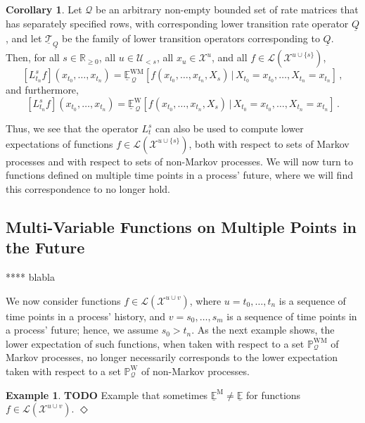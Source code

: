 \documentclass[10pt]{paper}
\theoremstyle{definition}
\newtheorem{exmp}{Example}%
\newtheorem{corollary}[theorem]{Corollary}
\newcommand{\reals}{\mathbb{R}}
\newcommand{\realsnonneg}{\reals_{\geq 0}}
\newcommand{\states}{\mathcal{X}}
\newcommand{\processes}{\mathbb{P}}
\newcommand{\wprocesses}{\processes^{\mathrm{W}}}
\newcommand{\wmprocesses}{\processes^{\mathrm{WM}}}
\newcommand{\gambles}{\mathcal{L}}
\newcommand{\rateset}{\mathcal{Q}}
\newcommand{\lrate}{\underline{Q}}
\newcommand{\exampleend}{\hfill$\Diamond$}
\begin{document}
\begin{corollary}\label{cor:inf_works_for_single_future_var}
Let $\rateset$ be an arbitrary non-empty bounded set of rate matrices that has separately specified rows, with corresponding lower transition rate operator $\lrate$, and let $\underline{\mathcal{T}}_{\lrate}$ be the family of lower transition operators corresponding to $\lrate$. Then, for all $s\in\realsnonneg$, all $u\in\mathcal{U}_{<s}$, all $x_u\in\states^u$, and all $f\in\gambles(\states^{u\cup\{s\}})$,
\begin{equation*}
\left[L_{t_n}^s f\right](x_{t_0},\ldots,x_{t_n}) = \underline{\mathbb{E}}^{\mathrm{WM}}_{\,\rateset}[f(x_{t_0},\ldots,x_{t_n},X_s)\,\vert\,X_{t_0}=x_{t_0},\ldots,X_{t_n}=x_{t_n}]\,,
\end{equation*}
and furthermore,
\begin{equation*}
\left[L_{t_n}^s f\right](x_{t_0},\ldots,x_{t_n}) = \underline{\mathbb{E}}^\mathrm{W}_{\,\rateset}[f(x_{t_0},\ldots,x_{t_n},X_s)\,\vert\,X_{t_0}=x_{t_0},\ldots,X_{t_n}=x_{t_n}]\,.
\end{equation*}
\end{corollary}

Thus, we see that the operator $L_t^s$ can also be used to compute lower expectations of functions $f\in\gambles(\states^{u\cup\{s\}})$, both with respect to sets of Markov processes and with respect to sets of non-Markov processes. We will now turn to functions defined on multiple time points in a process' future, where we will find this correspondence to no longer hold.


\subsection{Multi-Variable Functions on Multiple Points in the Future}\label{sec:decomposition}

**** blabla

We now consider functions $f\in\gambles(\states^{u\cup v})$, where $u=t_0,\ldots,t_n$ is a sequence of time points in a process' history, and $v=s_0,\ldots,s_m$ is a sequence of time points in a process' future; hence, we assume $s_0>t_n$. As the next example shows, the lower expectation of such functions, when taken with respect to a set $\wmprocesses_\rateset$ of Markov processes, no longer necessarily corresponds to the lower expectation taken with respect to a set $\wprocesses_\rateset$ of non-Markov processes.

\begin{exmp}
{\bf TODO} Example that sometimes $\underline{\mathbb{E}}^\mathrm{M}\neq \underline{\mathbb{E}}$ for functions $f\in\gambles(\states^{u\cup v})$.
\exampleend
\end{exmp}
\end{document}
